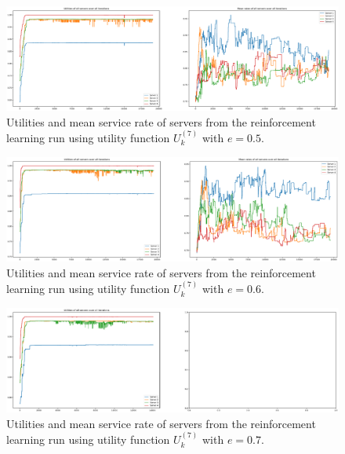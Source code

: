 \begin{figure}[H]
    \includegraphics[width=\textwidth]{chapters/00_appendix/03_more_rl_results/Bin/utility_7_eps/u7_1_e05.eps}
    \caption{Utilities and mean service rate of servers from the reinforcement
    learning run using utility function \(U_k^{(7)}\) with \(e = 0.5\).}
    \label{fig:RL_utility7_1_e05}
\end{figure}


\begin{figure}[H]
    \includegraphics[width=\textwidth]{chapters/00_appendix/03_more_rl_results/Bin/utility_7_eps/u7_1_e06.eps}
    \caption{Utilities and mean service rate of servers from the reinforcement
    learning run using utility function \(U_k^{(7)}\) with \(e = 0.6\).}
    \label{fig:RL_utility7_1_e06}
\end{figure}


\begin{figure}[H]
    \includegraphics[width=\textwidth]{chapters/00_appendix/03_more_rl_results/Bin/utility_7_eps/u7_1_e07.eps}
    \caption{Utilities and mean service rate of servers from the reinforcement
    learning run using utility function \(U_k^{(7)}\) with \(e = 0.7\).}
    \label{fig:RL_utility7_1_e07}
\end{figure}


